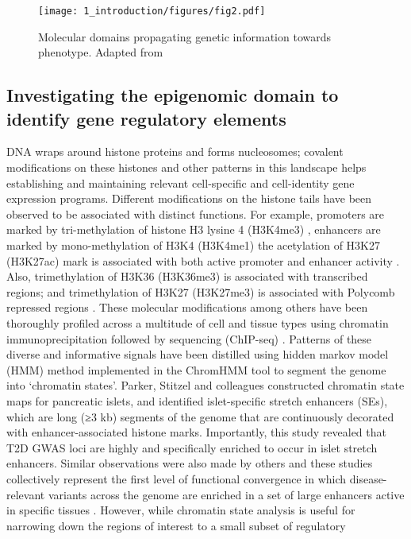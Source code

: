 \begin{figure}
        \centering
        \texttt{[image: 1\_introduction/figures/fig2.pdf]}
        \caption{Molecular domains propagating genetic information towards phenotype. Adapted from \cite{civelekSystemsGeneticsApproaches2014}}
        \label{fig:ci_f2}
\end{figure}


\subsection{Investigating the epigenomic domain to identify gene regulatory elements}
DNA wraps around histone proteins and forms nucleosomes; covalent modifications on these histones and other patterns in this landscape helps establishing and maintaining relevant cell-specific and cell-identity gene expression programs. Different modifications on the histone tails have been observed to be associated with distinct functions. For example, promoters are marked by tri-methylation of histone H3 lysine 4 (H3K4me3) \cite{bernsteinBivalentChromatinStructure2006, mikkelsenGenomewideMapsChromatin2007,adliGenomewideChromatinMaps2010}, enhancers are marked by mono-methylation of H3K4 (H3K4me1) \cite{heintzmanDistinctPredictiveChromatin2007} the acetylation of H3K27 (H3K27ac) mark is associated with both active promoter and enhancer activity \cite{mikkelsenGenomewideMapsChromatin2007}. Also, trimethylation of H3K36 (H3K36me3) is associated with transcribed regions; and trimethylation of H3K27 (H3K27me3) is associated with Polycomb repressed regions \cite{heintzmanDistinctPredictiveChromatin2007, zhouChartingHistoneModifications2011}. These molecular modifications among others have been thoroughly profiled across a multitude of cell and tissue types using chromatin immunoprecipitation followed by sequencing (ChIP-seq) \cite{theencodeprojectconsortiumIntegratedEncyclopediaDNA2012, consortiumIntegrativeAnalysis1112015}. Patterns of these diverse and informative signals have been distilled using hidden markov model (HMM) method implemented in the ChromHMM tool \cite{ernstMappingAnalysisChromatin2011, ernstChromHMMAutomatingChromatin2012} to segment the genome into ‘chromatin states’. Parker, Stitzel and colleagues constructed chromatin state maps for pancreatic islets, and identified islet-specific stretch enhancers (SEs), which are long (≥3 kb) segments of the genome that are continuously decorated with enhancer-associated histone marks. Importantly, this study revealed that T2D GWAS loci are highly and specifically enriched to occur in islet stretch enhancers. Similar observations were also made by others and these studies collectively represent the first level of functional convergence in which disease-relevant variants across the genome are enriched in a set of large enhancers active in specific tissues \cite{theencodeprojectconsortiumIntegratedEncyclopediaDNA2012,mauranoSystematicLocalizationCommon2012,trynkaChromatinMarksIdentify2013,parkerChromatinStretchEnhancer2013,pasqualiPancreaticIsletEnhancer2014, quangMotifSignaturesStretch2015}. However, while chromatin state analysis is useful for narrowing down the regions of interest to a small subset of regulatory 